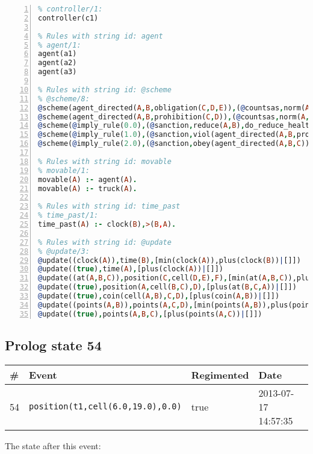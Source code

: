 \documentclass[11pt]{article}\usepackage[utf8]{inputenc}\usepackage{geometry}
\begin{document}
\begin{lstlisting}[language=Prolog, numbers=left]
% Rules with string id: controller
% controller/1:
controller(c1)

% Rules with string id: agent
% agent/1:
agent(a1)
agent(a2)
agent(a3)

% Rules with string id: @scheme
% @scheme/8:
@scheme(agent_directed(A,B,obligation(C,D,E)),(@countsas,norm(A,B,F,obligation(C,D,E)),F),false,(listTrue(C)),(time_past(D)),false,[plus(viol(agent_directed(A,B,obligation(C,D,E))))|[]],[plus(obey(agent_directed(A,B,obligation(C,D,E))))|[]])
@scheme(agent_directed(A,B,prohibition(C,D)),(@countsas,norm(A,B,E,prohibition(C,D)),E),(listTrue(C)),false,(false),false,[plus(viol(agent_directed(A,B,prohibition(C,D))))|[]],[plus(obey(agent_directed(A,B,prohibition(C,D))))|[]])
@scheme(@imply_rule(0.0),(@sanction,reduce(A,B),do_reduce_health(A,B),notifyAgent(A,changed(status))),true,false,false,false,[min(reduce(A,B))|[]],[])
@scheme(@imply_rule(1.0),(@sanction,viol(agent_directed(A,B,prohibition(C,D))),do_sanction(D)),true,false,false,false,[min(viol(agent_directed(A,B,prohibition(C,D))))|[]],[])
@scheme(@imply_rule(2.0),(@sanction,obey(agent_directed(A,B,C))),true,false,false,false,[min(obey(agent_directed(A,B,C)))|[]],[])

% Rules with string id: movable
% movable/1:
movable(A) :- agent(A).
movable(A) :- truck(A).

% Rules with string id: time_past
% time_past/1:
time_past(A) :- clock(B),>(B,A).

% Rules with string id: @update
% @update/3:
@update((clock(A)),time(B),[min(clock(A)),plus(clock(B))|[]])
@update((true),time(A),[plus(clock(A))|[]])
@update((at(A,B,C)),position(C,cell(D,E),F),[min(at(A,B,C)),plus(at(D,E,C))|[]])
@update((true),position(A,cell(B,C),D),[plus(at(B,C,A))|[]])
@update((true),coin(cell(A,B),C,D),[plus(coin(A,B))|[]])
@update((points(A,B)),points(A,C,D),[min(points(A,B)),plus(points(A,D))|[]])
@update((true),points(A,B,C),[plus(points(A,C))|[]])

\end{lstlisting}
\clearpage 
\subsection{Prolog state 54}
\begin{table}[ht]
\centering 
\begin{tabular}{l l l l} 
\textbf{\#} & \textbf{Event} & \textbf{Regimented} & \textbf{Date} \\ [0.5ex] 
\hline
54&\texttt{position(t1,cell(6.0,19.0),0.0)}&true&2013-07-17 14:57:35\\ [1ex] \hline\end{tabular}
\end{table}
The state after this event:
\end{document}
